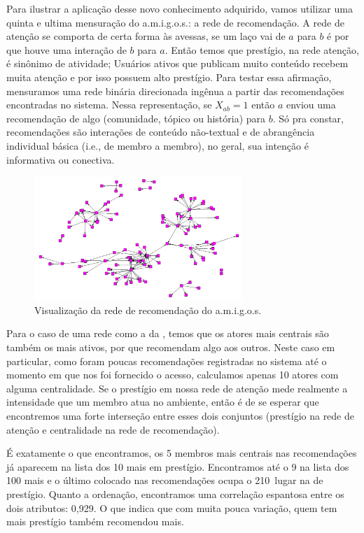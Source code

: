 Para ilustrar a aplicação desse novo conhecimento adquirido, vamos utilizar uma
quinta e ultima mensuração do a.m.i.g.o.s.: a rede de recomendação. A rede de
atenção se comporta de certa forma às avessas, se um laço vai de $a$ para $b$ é
por que houve uma interação de $b$ para $a$. Então temos que prestígio, na rede
atenção, é sinônimo de atividade; Usuários ativos que publicam muito conteúdo
recebem muita atenção e por isso possuem alto prestígio. Para testar essa
afirmação, mensuramos uma rede binária direcionada ingênua a partir das
recomendações encontradas no sistema. Nessa representação, se $X_{ab}=1$ então
$a$ enviou uma recomendação de algo (comunidade, tópico ou história) para $b$.
Só pra constar, recomendações são interações de conteúdo não-textual e de
abrangência individual básica (i.e., de membro a membro), no geral, sua
intenção é informativa ou conectiva.

\begin{figure}[h!]
  \centering
    \includegraphics[width=0.7\textwidth]{imgs/recmd.jpg}
  \caption{Visualização da rede de recomendação do a.m.i.g.o.s.}
    \label{ap:fig:recmd}
\end{figure}

Para o caso de uma rede como a da , temos que os atores
mais centrais são também os mais ativos, por que recomendam algo aos outros.
Neste caso em particular, como foram poucas recomendações registradas no sistema
até o momento em que nos foi fornecido o acesso, calculamos apenas 10 atores com
alguma centralidade. Se o prestígio em nossa rede de atenção mede realmente a
intensidade que um membro atua no ambiente, então é de se esperar que
encontremos uma forte interseção entre esses dois conjuntos (prestígio na rede
de atenção e centralidade na rede de recomendação).

É exatamente o que encontramos, os 5 membros mais centrais nas recomendações já
aparecem na lista dos 10 mais em prestígio. Encontramos até o 9 na  lista dos 100
mais e o último colocado nas recomendações ocupa o 210\textordmasculine~lugar
na de prestígio. Quanto a ordenação, encontramos uma correlação espantosa entre os
dois atributos: 0,929. O que indica que com muita pouca variação, quem tem mais
prestígio também recomendou mais.

